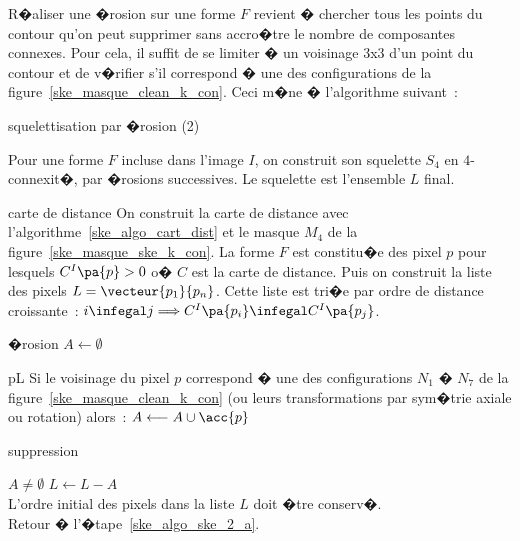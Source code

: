 
R�aliser une �rosion sur une forme $F$ revient � chercher tous les points du contour qu'on peut supprimer sans accro�tre le nombre de composantes connexes. Pour cela, il suffit de se limiter � un voisinage 3x3 d'un point du contour et de v�rifier s'il correspond � une des configurations de la figure~\ref{ske_masque_clean_k_con}. Ceci m�ne � l'algorithme suivant~:


            

        \begin{xalgorithm}{squelettisation par �rosion (2)}
        \label{ske_algo_ske_ero_algo_2}
        
        Pour une forme $F$ incluse dans l'image $I$, on construit son squelette $S_4$ en $4$-connexit�, 
        par �rosions successives. Le squelette est l'ensemble $L$ final.
        
        \begin{xalgostep}{carte de distance}
                On construit la carte de distance avec l'algorithme~\ref{ske_algo_cart_dist} et le masque $M_4$ de la
                figure~\ref{ske_masque_ske_k_con}. La forme $F$ est constitu�e des pixel $p$ 
                pour lesquels $C^I\pa{p} > 0$ o� 
                $C$ est la carte de distance. Puis on construit la liste des pixels $L=\vecteur{p_1}{p_n}$. 
                Cette liste est tri�e 
                par ordre de distance croissante~: $i \infegal j \Longrightarrow C^I\pa{p_i} \infegal C^I\pa{p_j}$.
        \end{xalgostep}
        
        \begin{xalgostep}{�rosion}\label{ske_algo_ske_2_a}
                $A \longleftarrow \emptyset$ \\
                \begin{xforeach}{p}{L}
                Si le voisinage du pixel $p$ correspond � une des configurations $N_1$ � $N_7$ de la 
                figure~\ref{ske_masque_clean_k_con} (ou leurs transformations par sym�trie axiale ou rotation) alors~: 
                $A \longleftarrow A \cup \acc{p}$
                \end{xforeach}
        \end{xalgostep}
        
        \begin{xalgostep}{suppression}
                \begin{xif}{$A \neq \emptyset$}
                    $L \longleftarrow L - A$ \\
                    L'ordre initial des pixels dans la liste $L$ doit �tre conserv�. \\
                    Retour � l'�tape~\ref{ske_algo_ske_2_a}.
                \end{xif}        
        \end{xalgostep}
                
        
        \end{xalgorithm}





